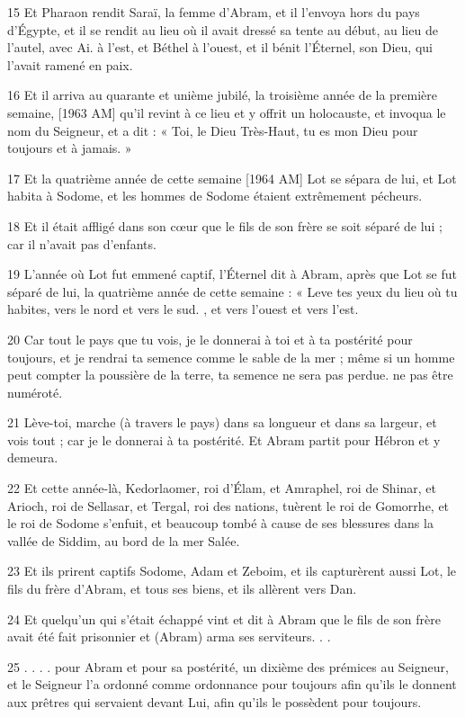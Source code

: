 \par 15 Et Pharaon rendit Saraï, la femme d'Abram, et il l'envoya hors du pays d'Égypte, et il se rendit au lieu où il avait dressé sa tente au début, au lieu de l'autel, avec Ai. à l'est, et Béthel à l'ouest, et il bénit l'Éternel, son Dieu, qui l'avait ramené en paix.
\par 16 Et il arriva au quarante et unième jubilé, la troisième année de la première semaine, [1963 AM] qu'il revint à ce lieu et y offrit un holocauste, et invoqua le nom du Seigneur, et a dit : « Toi, le Dieu Très-Haut, tu es mon Dieu pour toujours et à jamais. »
\par 17 Et la quatrième année de cette semaine [1964 AM] Lot se sépara de lui, et Lot habita à Sodome, et les hommes de Sodome étaient extrêmement pécheurs.
\par 18 Et il était affligé dans son cœur que le fils de son frère se soit séparé de lui ; car il n'avait pas d'enfants.
\par 19 L'année où Lot fut emmené captif, l'Éternel dit à Abram, après que Lot se fut séparé de lui, la quatrième année de cette semaine : « Leve tes yeux du lieu où tu habites, vers le nord et vers le sud. , et vers l’ouest et vers l’est.
\par 20 Car tout le pays que tu vois, je le donnerai à toi et à ta postérité pour toujours, et je rendrai ta semence comme le sable de la mer ; même si un homme peut compter la poussière de la terre, ta semence ne sera pas perdue. ne pas être numéroté.
\par 21 Lève-toi, marche (à travers le pays) dans sa longueur et dans sa largeur, et vois tout ; car je le donnerai à ta postérité. Et Abram partit pour Hébron et y demeura.
\par 22 Et cette année-là, Kedorlaomer, roi d'Élam, et Amraphel, roi de Shinar, et Arioch, roi de Sellasar, et Tergal, roi des nations, tuèrent le roi de Gomorrhe, et le roi de Sodome s'enfuit, et beaucoup tombé à cause de ses blessures dans la vallée de Siddim, au bord de la mer Salée.
\par 23 Et ils prirent captifs Sodome, Adam et Zeboim, et ils capturèrent aussi Lot, le fils du frère d'Abram, et tous ses biens, et ils allèrent vers Dan.
\par 24 Et quelqu'un qui s'était échappé vint et dit à Abram que le fils de son frère avait été fait prisonnier et (Abram) arma ses serviteurs. . .
\par 25 . . . . pour Abram et pour sa postérité, un dixième des prémices au Seigneur, et le Seigneur l'a ordonné comme ordonnance pour toujours afin qu'ils le donnent aux prêtres qui servaient devant Lui, afin qu'ils le possèdent pour toujours.
